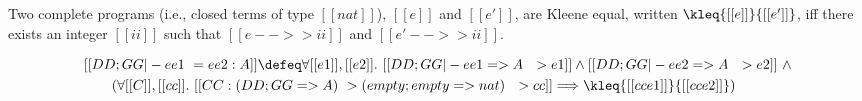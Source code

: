 \begin{definition}
  Two complete programs (i.e., closed terms of type $[[nat]]$), $[[e]]$ and $[[e']]$, are Kleene equal, written
  $\kleq{[[e]]}{[[e']]}$, iff there exists an integer $[[ii]]$ such that $[[e -->> ii]]$ and
  $[[e' -->> ii]]$.
\end{definition}

\begin{definition} \label{def:cxtx2}
  {\small
  \begin{align*}
    &[[DD ; GG |- ee1 ~= ee2 : A]]  \defeq \forall [[e1]], [[e2]].\  [[DD ; GG |- ee1 => A ~~> e1]] \land [[DD ; GG |- ee2 => A ~~> e2]] \ \land   \\
    &\qquad (\forall [[C]], [[cc]].\ [[CC : (DD; GG => A) ~> (empty ; empty => nat) ~~> cc]] \Longrightarrow \kleq{[[cc{e1}]]}{[[cc{e2}]]})
  \end{align*}
  }%
\end{definition}






